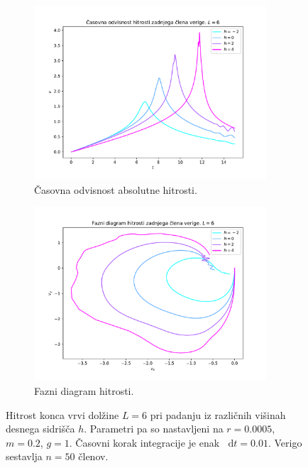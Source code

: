 \documentclass[a4paper, 12pt, slovene]{article}
\newcommand*\diff{\mathop{}\!\mathrm{d}}
\numberwithin{equation}{section}
\begin{document}
\begin{figure}[H]
\centering
\begin{subfigure}{0.495\textwidth}
	\centering
	\includegraphics[width=0.95\textwidth]{grafi/hitrost_visoko.pdf}
	\caption{Časovna odvisnost absolutne hitrosti.}
	\label{f:ver-v}
\end{subfigure}
\begin{subfigure}{0.495\textwidth}
	\centering
	\includegraphics[width=0.95\textwidth]{grafi/hitrost_visoko_xy.pdf}
	\caption{Fazni diagram hitrosti.}
	\label{f:ver-v-fd}
\end{subfigure}
\caption{Hitrost konca vrvi dolžine $L=6$ pri padanju iz različnih višinah desnega sidrišča $h$. Parametri pa so nastavljeni na $r=0.0005$, $m=0.2$, $g=1$. Časovni korak integracije je enak $\diff t = 0.01$. Verigo sestavlja $n=50$ členov.}
\label{f:vertikalno-hitrosti}
\end{figure}
\end{document}
